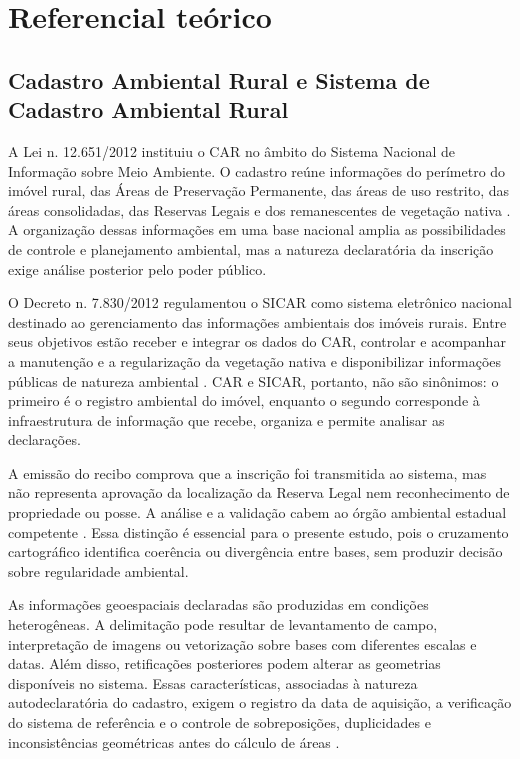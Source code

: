 
\section{Referencial teórico}

\subsection{Cadastro Ambiental Rural e Sistema de Cadastro Ambiental Rural}

A Lei n. 12.651/2012 instituiu o CAR no âmbito do Sistema Nacional de Informação sobre Meio Ambiente. O cadastro reúne informações do perímetro do imóvel rural, das Áreas de Preservação Permanente, das áreas de uso restrito, das áreas consolidadas, das Reservas Legais e dos remanescentes de vegetação nativa \cite{brasil2012}. A organização dessas informações em uma base nacional amplia as possibilidades de controle e planejamento ambiental, mas a natureza declaratória da inscrição exige análise posterior pelo poder público.

O Decreto n. 7.830/2012 regulamentou o SICAR como sistema eletrônico nacional destinado ao gerenciamento das informações ambientais dos imóveis rurais. Entre seus objetivos estão receber e integrar os dados do CAR, controlar e acompanhar a manutenção e a regularização da vegetação nativa e disponibilizar informações públicas de natureza ambiental \cite{brasil2012decreto}. CAR e SICAR, portanto, não são sinônimos: o primeiro é o registro ambiental do imóvel, enquanto o segundo corresponde à infraestrutura de informação que recebe, organiza e permite analisar as declarações.

A emissão do recibo comprova que a inscrição foi transmitida ao sistema, mas não representa aprovação da localização da Reserva Legal nem reconhecimento de propriedade ou posse. A análise e a validação cabem ao órgão ambiental estadual competente \cite{car2026}. Essa distinção é essencial para o presente estudo, pois o cruzamento cartográfico identifica coerência ou divergência entre bases, sem produzir decisão sobre regularidade ambiental.

As informações geoespaciais declaradas são produzidas em condições heterogêneas. A delimitação pode resultar de levantamento de campo, interpretação de imagens ou vetorização sobre bases com diferentes escalas e datas. Além disso, retificações posteriores podem alterar as geometrias disponíveis no sistema. Essas características, associadas à natureza autodeclaratória do cadastro, exigem o registro da data de aquisição, a verificação do sistema de referência e o controle de sobreposições, duplicidades e inconsistências geométricas antes do cálculo de áreas \cite{car2026,matias2024}.

